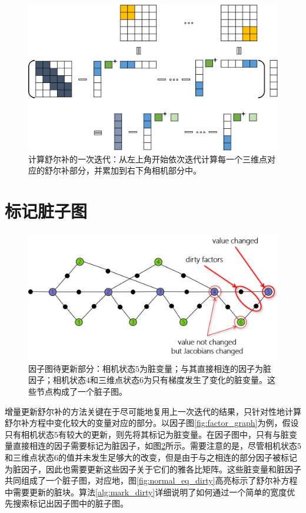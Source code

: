 \begin{figure}[htb!]
    \centering
    \includegraphics[width=\textwidth]{figs/schur_complement.png}
    \caption{计算舒尔补的一次迭代：从左上角开始依次迭代计算每一个三维点对应的舒尔补部分，并累加到右下角相机部分中。}
    \label{fig:schur_complement}
\end{figure}

\section{标记脏子图}

\begin{figure}[htb!]
    \centering
    \includegraphics[scale=.7]{figs/factor_graph_dirty.png}
    \caption{因子图待更新部分：相机状态$5$为脏变量；与其直接相连的因子为脏因子；相机状态$4$和三维点状态$6$为只有梯度发生了变化的脏变量。这些节点构成了一个脏子图。}
    \label{fig:factor_graph_dirty}
\end{figure}

增量更新舒尔补的方法关键在于尽可能地复用上一次迭代的结果，只针对性地计算舒尔补方程中变化较大的变量对应的部分。以因子图\ref{fig:factor_graph}为例，假设只有相机状态$5$有较大的更新，则先将其标记为脏变量。在因子图中，只有与脏变量直接相连的因子需要标记为脏因子，如图\ref{fig:factor_graph_dirty}所示。需要注意的是，尽管相机状态$5$和三维点状态$6$的值并未发生足够大的改变，但是由于与之相连的部分因子被标记为脏因子，因此也需要更新这些因子关于它们的雅各比矩阵。这些脏变量和脏因子共同组成了一个脏子图，对应地，图\ref{fig:normal_eq_dirty}高亮标示了舒尔补方程中需要更新的脏块。算法\ref{alg:mark_dirty}详细说明了如何通过一个简单的宽度优先搜索标记出因子图中的脏子图。

